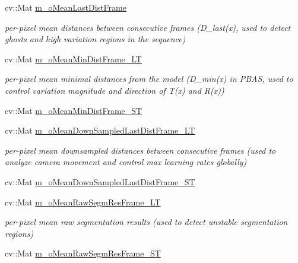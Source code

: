 \begin{DoxyCompactItemize}
cv\+::\+Mat \mbox{\hyperlink{class_background_subtractor_su_b_s_e_n_s_e_ad95bb91ff7ef9db725772b37d679e1a2}{m\+\_\+o\+Mean\+Last\+Dist\+Frame}}
\begin{DoxyCompactList}\small\item\em per-\/pixel mean distances between consecutive frames (\textquotesingle{}D\+\_\+last(x)\textquotesingle{}, used to detect ghosts and high variation regions in the sequence) \end{DoxyCompactList}\item 
cv\+::\+Mat \mbox{\hyperlink{class_background_subtractor_su_b_s_e_n_s_e_a8318e35d5fbbcffb8729700ef5e71a6e}{m\+\_\+o\+Mean\+Min\+Dist\+Frame\+\_\+\+LT}}
\begin{DoxyCompactList}\small\item\em per-\/pixel mean minimal distances from the model (\textquotesingle{}D\+\_\+min(x)\textquotesingle{} in P\+B\+AS, used to control variation magnitude and direction of \textquotesingle{}T(x)\textquotesingle{} and \textquotesingle{}R(x)\textquotesingle{}) \end{DoxyCompactList}\item 
cv\+::\+Mat \mbox{\hyperlink{class_background_subtractor_su_b_s_e_n_s_e_a53584c5c79017947c59d05dfd247cf5e}{m\+\_\+o\+Mean\+Min\+Dist\+Frame\+\_\+\+ST}}
\item 
cv\+::\+Mat \mbox{\hyperlink{class_background_subtractor_su_b_s_e_n_s_e_ab6056c53d3237ae04da509b36ec40486}{m\+\_\+o\+Mean\+Down\+Sampled\+Last\+Dist\+Frame\+\_\+\+LT}}
\begin{DoxyCompactList}\small\item\em per-\/pixel mean downsampled distances between consecutive frames (used to analyze camera movement and control max learning rates globally) \end{DoxyCompactList}\item 
cv\+::\+Mat \mbox{\hyperlink{class_background_subtractor_su_b_s_e_n_s_e_a92a9aec9a8b34383b67d97467bd34515}{m\+\_\+o\+Mean\+Down\+Sampled\+Last\+Dist\+Frame\+\_\+\+ST}}
\item 
cv\+::\+Mat \mbox{\hyperlink{class_background_subtractor_su_b_s_e_n_s_e_a7706b13433c4e9f4f8156e075fa7904d}{m\+\_\+o\+Mean\+Raw\+Segm\+Res\+Frame\+\_\+\+LT}}
\begin{DoxyCompactList}\small\item\em per-\/pixel mean raw segmentation results (used to detect unstable segmentation regions) \end{DoxyCompactList}\item 
cv\+::\+Mat \mbox{\hyperlink{class_background_subtractor_su_b_s_e_n_s_e_a3c9fd9cf995eb9a7b4006467ab874958}{m\+\_\+o\+Mean\+Raw\+Segm\+Res\+Frame\+\_\+\+ST}}

\end{DoxyCompactItemize}
